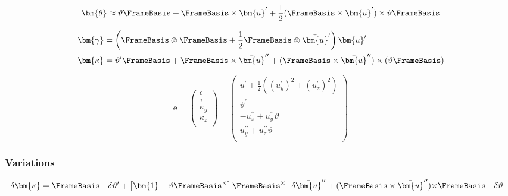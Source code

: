 
$$
\bm{\theta} \approx \vartheta \FrameBasis  
+ \FrameBasis \times\bar{\bm{u}}^{\prime} 
+ \frac{1}{2} (\FrameBasis \times\bar{\bm{u}}^{\prime}) \times \vartheta \FrameBasis 
$$


$$
\begin{aligned}
\bm{\gamma} &= \left(\FrameBasis \otimes\FrameBasis  + \frac{1}{2}\FrameBasis \otimes\bar{\bm{u}}^{\prime}\right)\bm{u}^{\prime} \\
\bm{\kappa} &= \vartheta^{\prime} \FrameBasis  
+ \FrameBasis \times\bar{\bm{u}}^{\prime\prime} 
+ (\FrameBasis \times\bar{\bm{u}}^{\prime\prime})\times(\vartheta \FrameBasis )
\end{aligned}
$$

$$
\boldsymbol{e} = \begin{pmatrix}
\epsilon \\ 
\tau \\
\kappa_y \\
\kappa_z \\ 
\end{pmatrix}
= \left(\begin{array}{c}
u^{\prime}+\frac{1}{2}\left(\left(u_y^{\prime}\right)^2+\left(u_z^{\prime}\right)^2\right) \\ 
\vartheta^{\prime} \\ %
-u_z^{\prime \prime}+u_y^{\prime \prime} \vartheta \\
u_y^{\prime \prime}+u_z^{\prime \prime} \vartheta \\
\end{array}\right)
$$

\subsubsection{Variations}

$$
\begin{aligned}
\delta\bm{\kappa} &= 
 \FrameBasis  ~~~ \delta \vartheta^{\prime} 
 +\left[\bm{1} 
- \vartheta\FrameBasis^{\times}\right]\FrameBasis^{\times} ~~ \delta \bar{\bm{u}}^{\prime\prime} +(\FrameBasis \times\bar{\bm{u}}^{\prime\prime}) {\times} \FrameBasis  ~~~ \delta \vartheta
\end{aligned}
$$


